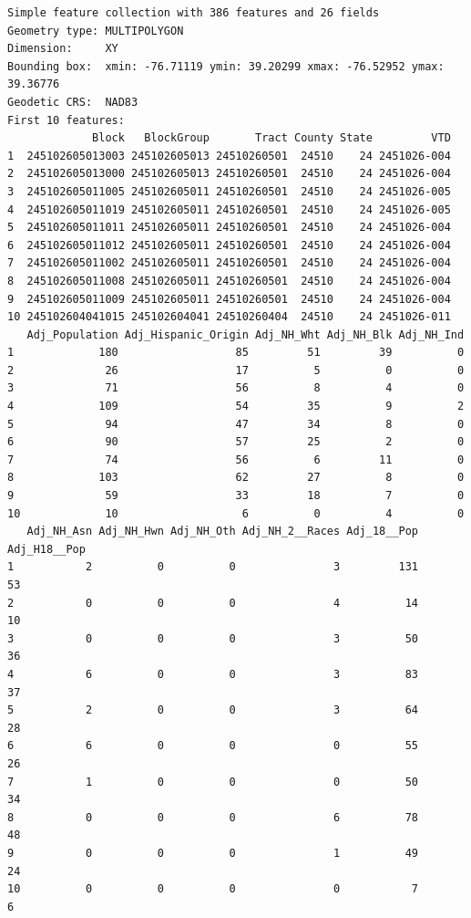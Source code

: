 \documentclass[
  letterpaper,
  DIV=11,
  numbers=noendperiod]{scrreprt}
\begin{document}
\begin{verbatim}
Simple feature collection with 386 features and 26 fields
Geometry type: MULTIPOLYGON
Dimension:     XY
Bounding box:  xmin: -76.71119 ymin: 39.20299 xmax: -76.52952 ymax: 39.36776
Geodetic CRS:  NAD83
First 10 features:
             Block   BlockGroup       Tract County State         VTD
1  245102605013003 245102605013 24510260501  24510    24 2451026-004
2  245102605013000 245102605013 24510260501  24510    24 2451026-004
3  245102605011005 245102605011 24510260501  24510    24 2451026-005
4  245102605011019 245102605011 24510260501  24510    24 2451026-005
5  245102605011011 245102605011 24510260501  24510    24 2451026-004
6  245102605011012 245102605011 24510260501  24510    24 2451026-004
7  245102605011002 245102605011 24510260501  24510    24 2451026-004
8  245102605011008 245102605011 24510260501  24510    24 2451026-004
9  245102605011009 245102605011 24510260501  24510    24 2451026-004
10 245102604041015 245102604041 24510260404  24510    24 2451026-011
   Adj_Population Adj_Hispanic_Origin Adj_NH_Wht Adj_NH_Blk Adj_NH_Ind
1             180                  85         51         39          0
2              26                  17          5          0          0
3              71                  56          8          4          0
4             109                  54         35          9          2
5              94                  47         34          8          0
6              90                  57         25          2          0
7              74                  56          6         11          0
8             103                  62         27          8          0
9              59                  33         18          7          0
10             10                   6          0          4          0
   Adj_NH_Asn Adj_NH_Hwn Adj_NH_Oth Adj_NH_2__Races Adj_18__Pop Adj_H18__Pop
1           2          0          0               3         131           53
2           0          0          0               4          14           10
3           0          0          0               3          50           36
4           6          0          0               3          83           37
5           2          0          0               3          64           28
6           6          0          0               0          55           26
7           1          0          0               0          50           34
8           0          0          0               6          78           48
9           0          0          0               1          49           24
10          0          0          0               0           7            6

\end{verbatim}
\end{document}

